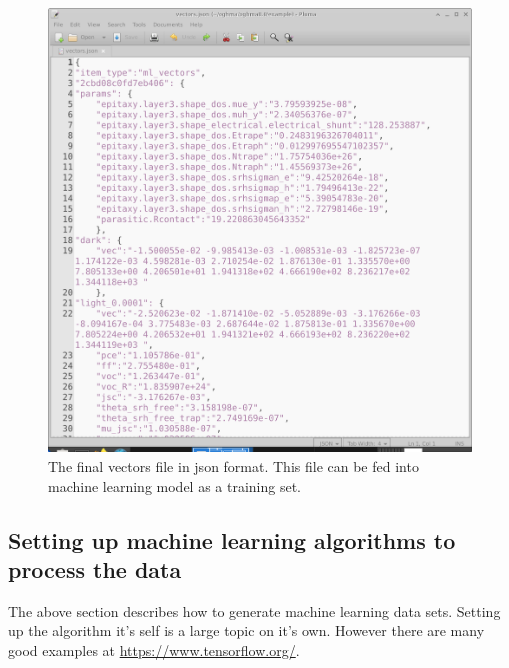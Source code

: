 \begin{figure}
\centering
\includegraphics[width=\textwidth,height=1.0\textwidth]{./images/ml/output.png}
\caption{The final vectors file in json format. This file can be fed into machine learning model as a training set.}
\label{fig:ml_vectors_file}
\end{figure}

\subsection{Setting up machine learning algorithms to process the data}
The above section describes how to generate machine learning data sets. Setting up the algorithm it's self is a large topic on it's own. However there are many good examples at \href{https://www.tensorflow.org/}{https://www.tensorflow.org/}.
